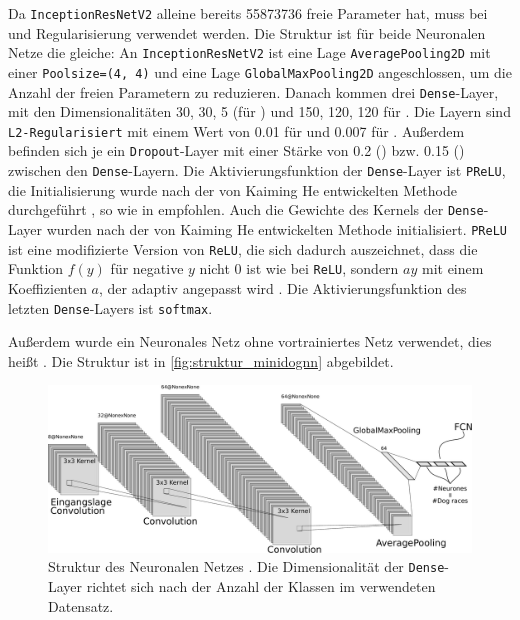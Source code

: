 Da \texttt{InceptionResNetV2} alleine bereits 55873736 freie Parameter hat, muss
bei \PreBig{} und \PreDog{} Regularisierung verwendet werden. Die Struktur ist für
beide Neuronalen Netze die gleiche: An \texttt{InceptionResNetV2} ist eine Lage
\texttt{AveragePooling2D} mit einer \texttt{Poolsize=(4, 4)} und eine Lage
\texttt{GlobalMaxPooling2D} angeschlossen, um die Anzahl der freien Parametern
zu reduzieren. Danach kommen drei \texttt{Dense}-Layer, mit den
Dimensionalitäten 30, 30, 5 (für \PreDog{}) und 150, 120, 120 für \PreBig{}. Die
Layern sind \texttt{L2-Regularisiert} mit einem Wert von 0.01 für \PreDog{} und
0.007 für \PreBig{}. Außerdem befinden sich je ein \texttt{Dropout}-Layer mit
einer Stärke von 0.2 (\PreDog{}) bzw. 0.15 (\PreBig{}) zwischen den
\texttt{Dense}-Layern. Die Aktivierungsfunktion der \texttt{Dense}-Layer ist
\texttt{PReLU}, die Initialisierung wurde nach der von Kaiming He entwickelten
Methode durchgeführt \cite{tensowflow-he}, so wie in \cite{he-ini} empfohlen.
Auch die Gewichte des Kernels der \texttt{Dense}-Layer wurden nach der von
Kaiming He entwickelten Methode initialisiert. \texttt{PReLU} ist eine
modifizierte Version von \texttt{ReLU}, die sich dadurch auszeichnet, dass die
Funktion $f(y)$ für negative $y$ nicht 0 ist wie bei \texttt{ReLU}, sondern $ay$
mit einem Koeffizienten $a$, der adaptiv angepasst wird \cite{prelu}. Die
Aktivierungsfunktion des letzten \texttt{Dense}-Layers ist \texttt{softmax}.

Außerdem wurde ein Neuronales Netz ohne vortrainiertes Netz verwendet, dies heißt
\MiniDog{}. Die Struktur ist in \autoref{fig:struktur_minidognn} abgebildet.

\begin{figure}
  \centering
  \includegraphics[width=\textwidth]{pics/nn.pdf}
  \caption{Struktur des Neuronalen Netzes \MiniDog{}. Die Dimensionalität
  der \texttt{Dense}-Layer richtet sich nach der Anzahl der Klassen im verwendeten Datensatz.}
  \label{fig:struktur_minidognn}
\end{figure}


